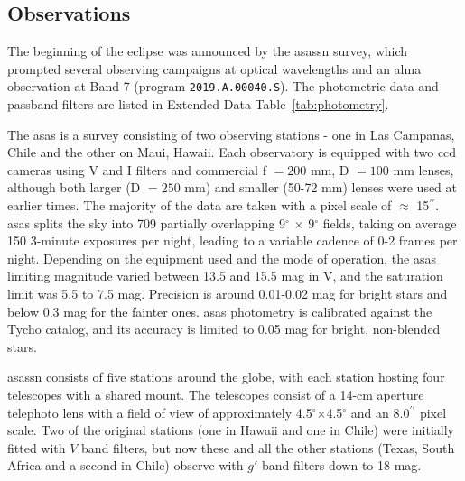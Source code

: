 \documentclass[sn-nature,oneside]{sn-jnl}%
\newcommand*\degr{\ensuremath{^\circ}}
\newcommand*\arcsec{\ensuremath{^{\prime\prime}}}   %
\begin{document}
\subsection*{Observations}\label{sec:obs}

The beginning of the eclipse was announced \cite{RizzoSmith21} by the \gls{asassn} survey, which prompted several observing campaigns at optical wavelengths and an \gls{alma} observation at Band 7 (program \texttt{2019.A.00040.S}).
%
The photometric data and passband filters are listed in Extended Data Table~\ref{tab:photometry}.


The \gls{asas} \cite[][]{pojmanski_all_1997, asas_2005, asas_2018} is a survey consisting of two observing stations - one in Las Campanas, Chile and the other on Maui, Hawaii. 
%
Each observatory is equipped with two \gls{ccd} cameras using V and I filters and commercial f $ = 200$ mm, D $= 100$ mm lenses, although both larger (D $=250$ mm) and smaller (50-72 mm) lenses were used at earlier times.
%
The majority of the data are taken with a pixel scale of $\approx$ 15\arcsec{}.
%
\gls{asas} splits the sky into 709 partially overlapping 9\degr{} $\times$ 9\degr{} fields, taking on average 150 3-minute exposures per night, leading to a variable cadence of 0-2 frames per night.
%
Depending on the equipment used and the mode of operation, the \gls{asas} limiting magnitude varied between 13.5 and 15.5 mag in V, and the saturation limit was 5.5 to 7.5 mag. 
%
Precision is around 0.01-0.02 mag for bright stars and below 0.3 mag for the fainter ones. 
%
\gls{asas} photometry is calibrated against the Tycho catalog, and its accuracy is limited to 0.05 mag for bright, non-blended stars.


\Gls{asassn} \cite[][]{shappee_man_2014,kochanek_all-sky_2017} consists of five stations around the globe, with each station hosting four telescopes with a shared mount.
%
The telescopes consist of a 14-cm aperture telephoto lens with a field of view of approximately 4.5\degr{}$\times$4.5\degr{} and an 8.0\arcsec{} pixel scale.
% 
Two of the original stations (one in Hawaii and one in Chile) were initially fitted with $V$ band filters, but now these and all the other stations (Texas, South Africa and a second in Chile) observe with $g'$ band filters down to 18 mag.
\end{document}
